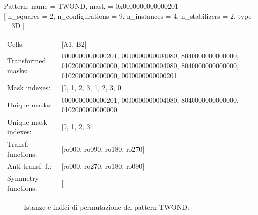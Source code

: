 \begin{tcolorbox}[sharp corners, fontupper=\ttfamily\small, colback=white]
  \noindent Pattern: name = TWOND, mask = 0x0000000000000201\\
  {[} n\_squares = 2, n\_configurations = 9,
  n\_instances = 4, n\_stabilizers = 2, type = 3D { ]}\\[1.0ex]
  \begin{tabularx}{\textwidth}{@{} p{3.5cm} X @{}}
    Cells:               & {[}A1, B2{]}\\[0.5ex]
    Transformed masks:   & 0000000000000201, 0000000000004080, 8040000000000000, 0102000000000000, 0000000000004080, 8040000000000000, 0102000000000000, 0000000000000201\\[0.5ex]
    Mask indexes:        & {[}0, 1, 2, 3, 1, 2, 3, 0{]}\\[0.5ex]
    Unique masks:        & 0000000000000201, 0000000000004080, 8040000000000000, 0102000000000000\\[0.5ex]
    Unique mask indexes: & {[}0, 1, 2, 3{]}\\[0.5ex]
    Transf. functions:   & {[}ro000, ro090, ro180, ro270{]}\\[0.5ex]
    Anti-transf. f.:     & {[}ro000, ro270, ro180, ro090{]}\\[0.5ex]
    Symmetry functions:  & {[}{]}\\[0.5ex]
  \end{tabularx}
\end{tcolorbox}

\begin{figure}[htbp]
  \centering
   \hfill
   \hfill
   \hfill
  \vspace{0.3cm}
   \hfill
   \hfill
   \hfill
  \caption{Istanze e indici di permutazione del pattern TWOND.}
\end{figure}

\newpage
